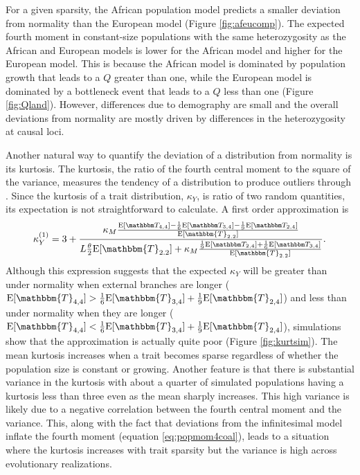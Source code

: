 For a given sparsity, the African population model predicts a smaller deviation
from normality than the European model (Figure \ref{fig:afeucomp}). The expected
fourth moment in constant-size populations with the same heterozygosity as the
African and European models is lower for the African model and higher for the
European model. This is because the African model is dominated by population
growth that leads to a $Q$ greater than one, while the European model is
dominated by a bottleneck event that leads to a $Q$ less than one
(Figure \ref{fig:Qland}). However, differences due to demography are small and
the overall deviations from normality are mostly driven by differences in the
heterozygosity at causal loci.

Another natural way to quantify the deviation of a distribution from normality
is its kurtosis. The kurtosis, the ratio of the fourth central moment to the
square of the variance, measures the tendency of a distribution to produce
outliers through \citep{Westfall2014}. Since the kurtosis of a trait
distribution, $\kappa_Y$, is ratio of two random quantities, its expectation is
not straightforward to calculate. A first order approximation is
\begin{equation}
    \label{eq:firstord} 
\kappa_Y^{(1)} = 3 + \frac{\kappa_M \frac{\CCC}{\E[\mathbbm{T}_{2.2}]}} {L \T \E[\mathbbm{T}_{2.2}]
    + \kappa_M \frac{\BBB}{\E[\mathbbm{T}_{2.2}]}}.
\end{equation}
Although this expression suggests that the expected $\kappa_Y$ will be greater
than under normality when external branches are longer ($\E[\mathbbm{T}_{4,4}] >
\frac{1}{6}\E[\mathbbm{T}_{3,4}] + \frac{1}{9}\E[\mathbbm{T}_{2,4}]$) and less than under normality
when they are longer ($\E[\mathbbm{T}_{4,4}] < \frac{1}{6}\E[\mathbbm{T}_{3,4}] +
\frac{1}{9}\E[\mathbbm{T}_{2,4}]$), simulations show that the approximation is actually
quite poor (Figure \ref{fig:kurtsim}). The mean kurtosis increases when a trait
becomes sparse regardless of whether the population size is constant or growing.
Another feature is that there is substantial variance in the kurtosis with about
a quarter of simulated populations having a kurtosis less than three even as the
mean sharply increases. This high variance is likely due to a negative
correlation between the fourth central moment and the variance. This, along with
the fact that deviations from the infinitesimal model inflate the fourth moment
(equation \eqref{eq:popmom4coal}), leads to a situation where the kurtosis
increases with trait sparsity but the variance is high across evolutionary
realizations.

